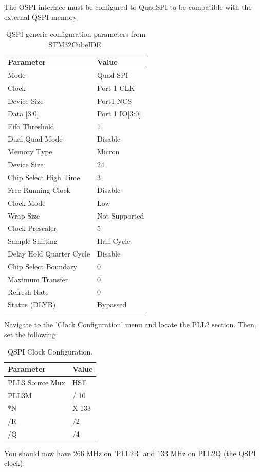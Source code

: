 The OSPI interface must be configured to QuadSPI to be compatible with the external QSPI memory:
\begin{table}[H]
    \centering
    \begin{tabular}{ll}
        \hline
        \textbf{Parameter} & \textbf{Value} \\
        \hline
        Mode & Quad SPI \\
        Clock & Port 1 CLK \\
        Device Size & Port1 NCS \\
        Data [3:0] & Port 1 IO[3:0] \\
        Fifo Threshold & 1 \\
        Dual Quad Mode & Disable \\
        Memory Type & Micron \\
        Device Size & 24 \\
        Chip Select High Time & 3 \\
        Free Running Clock & Disable \\
        Clock Mode & Low \\
        Wrap Size & Not Supported \\
        Clock Prescaler & 5 \\
        Sample Shifting & Half Cycle \\
        Delay Hold Quarter Cycle & Disable \\
        Chip Select Boundary & 0 \\
        Maximum Transfer & 0 \\
        Refresh Rate & 0 \\
        Status (DLYB) & Bypassed \\
        \hline
    \end{tabular}
    \caption{QSPI generic configuration parameters from STM32CubeIDE.}
\end{table}
Navigate to the 'Clock Configuration' menu and locate the PLL2 section. Then, set the following:
\begin{table}[H]
    \centering
    \begin{tabular}{ll}
        \hline
        \textbf{Parameter} & \textbf{Value} \\
        \hline
        PLL3 Source Mux & HSE \\
        PLL3M & / 10 \\
        *N & X 133 \\
        /R & /2 \\
        /Q & /4 \\
        \hline
    \end{tabular}
    \caption{QSPI Clock Configuration.}
\end{table}
You should now have $266$ MHz on 'PLL2R' and $133$ MHz on PLL2Q (the QSPI clock).